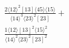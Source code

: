 \documentclass[varwidth, border=5pt]{standalone}
\begin{document}
\begin{my}
$\begin{gathered}
\scriptscriptstyle\frac{2⟨12⟩^2[13]⟨45⟩⟨15⟩}{⟨14⟩^3⟨23⟩^2[23]}+\\
\scriptscriptstyle\frac{1⟨12⟩[13]^2⟨15⟩^2}{⟨14⟩^2⟨23⟩^2[23]^2}\phantom{+}
\end{gathered}$
\end{my}
\end{document}
